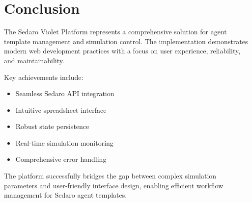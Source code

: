 \documentclass[12pt,a4paper]{article}
\begin{document}
\section{Conclusion}

The Sedaro Violet Platform represents a comprehensive solution for agent template management and simulation control. The implementation demonstrates modern web development practices with a focus on user experience, reliability, and maintainability.

Key achievements include:
\begin{itemize}
    \item Seamless Sedaro API integration
    \item Intuitive spreadsheet interface
    \item Robust state persistence
    \item Real-time simulation monitoring
    \item Comprehensive error handling
\end{itemize}

The platform successfully bridges the gap between complex simulation parameters and user-friendly interface design, enabling efficient workflow management for Sedaro agent templates.
\end{document}
